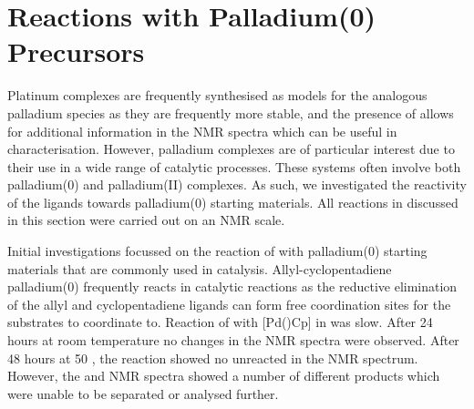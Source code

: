 %
%
%
%
%
%




\section{Reactions with Palladium(0) Precursors}

Platinum complexes are frequently synthesised as models for the analogous palladium species as they are frequently more stable, and the presence of \Pt{} allows for additional information in the NMR spectra which can be useful in characterisation.  However, palladium complexes are of particular interest due to their use in a wide range of catalytic processes.  These systems often involve both palladium(0) and palladium(II) complexes.  As such, we investigated the reactivity of the \tBuxantphos{} ligands towards palladium(0) starting materials.  All reactions in discussed in this section were carried out on an NMR scale.  

Initial investigations focussed on the reaction of \tButhixantphos{} with palladium(0) starting materials that are commonly used in catalysis.  Allyl-cyclopentadiene palladium(0) frequently reacts in catalytic reactions as the reductive elimination of the allyl and cyclopentadiene ligands can form free coordination sites for the substrates to coordinate to.  Reaction of \tButhixantphos{} with  [Pd()Cp] in  was slow.  After 24 hours at room temperature no changes in the NMR spectra were observed.  After 48 hours at 50 \degC, the reaction showed no unreacted \tButhixantphos{} in the \phosphorus{} NMR spectrum.  However, the \phosphorus{} and \proton{} NMR spectra showed a number of different products which were unable to be separated or analysed further.

